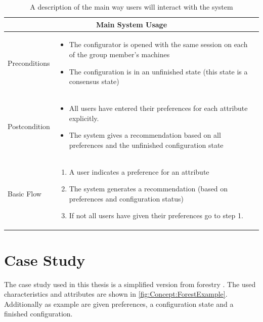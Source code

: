 \begin{table}
    \begin{center}
        \begin{tabularx}{\columnwidth}{l|X}
            \multicolumn{2}{c}{Main System Usage} \\
            \hline
            Preconditions   & 
                \begin{itemize}
                    \item The configurator is opened with the same session on each of the group member's machines
                    \item The configuration is in an unfinished state (this state is a consensus state)
                \end{itemize} \\
            \hline
            Postcondition   & 
                \begin{itemize}
                    \item All users have entered their preferences for each attribute explicitly.
                    \item The system gives a recommendation based on all preferences and the unfinished configuration state
                \end{itemize} \\
            \hline
            Basic Flow      & 
                \begin{enumerate}
                    \item A user indicates a preference for an attribute
                    \item The system generates a recommendation (based on preferences and configuration status)
                    \item If not all users have given their preferences go to step 1.
                \end{enumerate} \\
            \hline
        \end{tabularx}
        \caption{A description of the main way users will interact with the system}
        \label{tab:Concept:MainUseCase}
    \end{center}
\end{table}

\section{Case Study}
\label{sec:Concept:CaseStudy}

The case study used in this thesis is a simplified version from forestry .
The used characteristics and attributes are shown in \autoref{fig:Concept:ForestExample}. Additionally as example are given preferences, a configuration state and a finished configuration.

